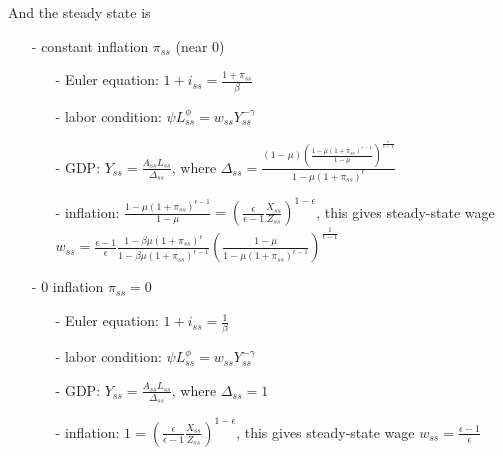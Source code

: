 \documentclass[10pt,landscape,a4paper]{article}
\begin{document}
\begin{multicols*}{3}
\vspace{2pt}
And the steady state is 
\begin{itemize}
    \item[-] constant inflation $\pi_{ss}$ (near 0)
    \begin{itemize}
        \item[-] Euler equation: $1+i_{ss} = \frac{1+\pi_{ss}}{\beta}$ 
        \item[-] labor condition: $\psi L_{ss}^{\phi} = w_{ss} Y_{ss}^{-\gamma}$
        \item[-] GDP: $Y_{ss}=\frac{A_{ss}L_{ss}}{\Delta_{ss}}$, where $\Delta_{ss}=\frac{(1-\mu)\left(\frac{1-\mu(1+\pi_{ss})^{\epsilon-1}}{1-\mu}\right)^{\frac{\epsilon}{\epsilon-1}}}{1-\mu(1+\pi_{ss})^{\epsilon}}$
        \item[-] inflation: $\frac{1-\mu(1+\pi_{ss})^{\epsilon-1}}{1-\mu} = \left( \frac{\epsilon}{\epsilon-1}\frac{X_{ss}}{Z_{ss}} \right)^{1-\epsilon}$, this gives steady-state wage $w_{ss} = \frac{\epsilon-1}{\epsilon} \frac{1-\beta\mu(1+\pi_{ss})^{\epsilon}}{1-\beta\mu(1+\pi_{ss})^{\epsilon-1}}\left( \frac{1-\mu}{1-\mu(1+\pi_{ss})^{\epsilon-1}} \right)^{\frac{1}{\epsilon-1}}$
    \end{itemize}
    \item[-] 0 inflation $\pi_{ss}=0$
    \begin{itemize}
        \item[-] Euler equation: $1+i_{ss} = \frac{1}{\beta}$ 
        \item[-] labor condition: $\psi L_{ss}^{\phi} = w_{ss} Y_{ss}^{-\gamma}$
        \item[-] GDP: $Y_{ss}=\frac{A_{ss}L_{ss}}{\Delta_{ss}}$, where $\Delta_{ss}=1$
        \item[-] inflation: $1 = \left( \frac{\epsilon}{\epsilon-1}\frac{X_{ss}}{Z_{ss}} \right)^{1-\epsilon}$, this gives steady-state wage $w_{ss} = \frac{\epsilon-1}{\epsilon}$
    \end{itemize}
\end{itemize}


\end{multicols*}
\end{document}
